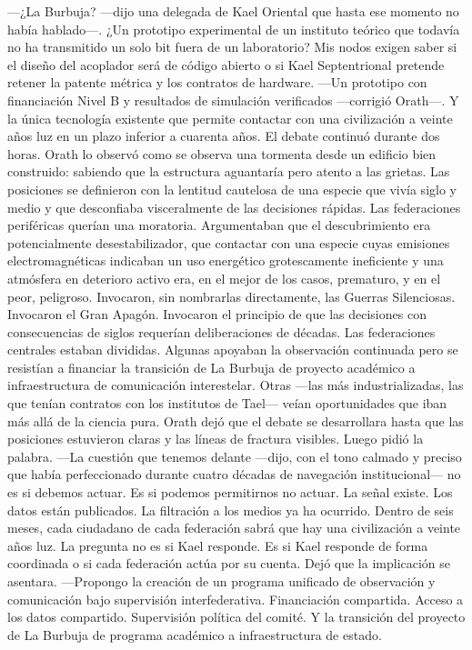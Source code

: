 \documentclass[11pt,a5paper,twoside]{book}
\begin{document}
—¿La Burbuja? —dijo una delegada de Kael Oriental que hasta ese momento no había hablado—. ¿Un prototipo experimental de un instituto teórico que todavía no ha transmitido un solo bit fuera de un laboratorio? Mis nodos exigen saber si el diseño del acoplador será de código abierto o si Kael Septentrional pretende retener la patente métrica y los contratos de hardware.
—Un prototipo con financiación Nivel B y resultados de simulación verificados —corrigió Orath—. Y la única tecnología existente que permite contactar con una civilización a veinte años luz en un plazo inferior a cuarenta años.
El debate continuó durante dos horas.
Orath lo observó como se observa una tormenta desde un edificio bien construido: sabiendo que la estructura aguantaría pero atento a las grietas. Las posiciones se definieron con la lentitud cautelosa de una especie que vivía siglo y medio y que desconfiaba visceralmente de las decisiones rápidas.
Las federaciones periféricas querían una moratoria. Argumentaban que el descubrimiento era potencialmente desestabilizador, que contactar con una especie cuyas emisiones electromagnéticas indicaban un uso energético grotescamente ineficiente y una atmósfera en deterioro activo era, en el mejor de los casos, prematuro, y en el peor, peligroso. Invocaron, sin nombrarlas directamente, las Guerras Silenciosas. Invocaron el Gran Apagón. Invocaron el principio de que las decisiones con consecuencias de siglos requerían deliberaciones de décadas.
Las federaciones centrales estaban divididas. Algunas apoyaban la observación continuada pero se resistían a financiar la transición de La Burbuja de proyecto académico a infraestructura de comunicación interestelar. Otras —las más industrializadas, las que tenían contratos con los institutos de Tael— veían oportunidades que iban más allá de la ciencia pura.
Orath dejó que el debate se desarrollara hasta que las posiciones estuvieron claras y las líneas de fractura visibles. Luego pidió la palabra.
—La cuestión que tenemos delante —dijo, con el tono calmado y preciso que había perfeccionado durante cuatro décadas de navegación institucional— no es si debemos actuar. Es si podemos permitirnos no actuar. La señal existe. Los datos están publicados. La filtración a los medios ya ha ocurrido. Dentro de seis meses, cada ciudadano de cada federación sabrá que hay una civilización a veinte años luz. La pregunta no es si Kael responde. Es si Kael responde de forma coordinada o si cada federación actúa por su cuenta.
Dejó que la implicación se asentara.
—Propongo la creación de un programa unificado de observación y comunicación bajo supervisión interfederativa. Financiación compartida. Acceso a los datos compartido. Supervisión política del comité. Y la transición del proyecto de La Burbuja de programa académico a infraestructura de estado.
\end{document}
